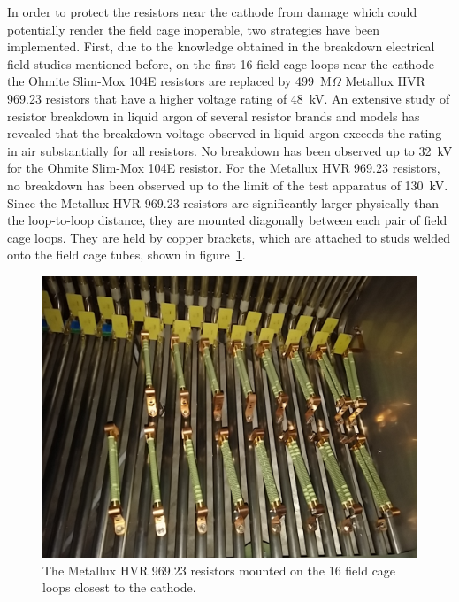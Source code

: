 In order to protect the resistors near the cathode from damage which could potentially render the field cage inoperable, two strategies have been implemented.  First, due to the knowledge obtained in the breakdown electrical field studies mentioned before, on the first 16 field cage loops near the cathode the Ohmite Slim-Mox 104E resistors are replaced by 499~M$\Omega$ Metallux HVR 969.23 resistors that have a higher voltage rating of 48~kV. An extensive study of resistor breakdown in liquid argon of several resistor brands and models \cite{Bagby:2014wva} has revealed that the breakdown voltage observed in liquid argon exceeds the rating in air substantially for all resistors. No breakdown has been observed up to 32~kV for the Ohmite Slim-Mox 104E resistor. For the Metallux HVR 969.23 resistors, no breakdown has been observed up to the limit of the test apparatus of 130~kV.  Since the Metallux HVR 969.23 resistors are significantly larger physically than the loop-to-loop distance, they are mounted diagonally between each pair of field cage loops. They are held by copper brackets, which are attached to studs welded onto the field cage tubes, shown in figure~\ref{fig:tpc-voltage-divider-metallux}.

\begin{figure}[htb]
\centering	
\includegraphics[width=0.8\linewidth]{figures/tpc-voltage-divider-metallux.jpg}
\caption{The Metallux HVR 969.23 resistors mounted on the 16 field cage loops closest to the cathode.}
\label{fig:tpc-voltage-divider-metallux}
\end{figure}


